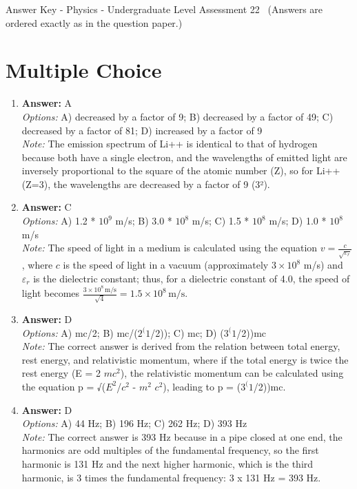 \documentclass[12pt]{article}
\begin{document}
\begin{center}
Answer Key - Physics - Undergraduate Level Assessment 22 \
\small (Answers are ordered exactly as in the question paper.)
\end{center}

\section*{Multiple Choice}
\begin{enumerate}[label=\arabic*.]
\item \textbf{Answer:} A
\\ \textit{Options:} A) decreased by a factor of 9; B) decreased by a factor of 49; C) decreased by a factor of 81; D) increased by a factor of 9
\\ \textit{Note:} The emission spectrum of Li++ is identical to that of hydrogen because both have a single electron, and the wavelengths of emitted light are inversely proportional to the square of the atomic number (Z), so for Li++ (Z=3), the wavelengths are decreased by a factor of 9 (3²).
\item \textbf{Answer:} C
\\ \textit{Options:} A) 1.2 * $10^9$ m/s; B) 3.0 * $10^8$ m/s; C) 1.5 * $10^8$ m/s; D) 1.0 * $10^8$ m/s
\\ \textit{Note:} The speed of light in a medium is calculated using the equation \( v = \frac{c}{\sqrt{\varepsilon_r}} \), where \( c \) is the speed of light in a vacuum (approximately \( 3 \times 10^8 \) m/s) and \( \varepsilon_r \) is the dielectric constant; thus, for a dielectric constant of 4.0, the speed of light becomes \( \frac{3 \times 10^8 \, \text{m/s}}{\sqrt{4}} = 1.5 \times 10^8 \, \text{m/s} \).
\item \textbf{Answer:} D
\\ \textit{Options:} A) mc/2; B) mc/($2^(1$/2)); C) mc; D) ($3^(1$/2))mc
\\ \textit{Note:} The correct answer is derived from the relation between total energy, rest energy, and relativistic momentum, where if the total energy is twice the rest energy (E = 2 $mc^2$), the relativistic momentum can be calculated using the equation p = √($E^2$/$c^2$ - $m^2$ $c^2$), leading to p = ($3^(1$/2))mc.
\item \textbf{Answer:} D
\\ \textit{Options:} A) 44 Hz; B) 196 Hz; C) 262 Hz; D) 393 Hz
\\ \textit{Note:} The correct answer is 393 Hz because in a pipe closed at one end, the harmonics are odd multiples of the fundamental frequency, so the first harmonic is 131 Hz and the next higher harmonic, which is the third harmonic, is 3 times the fundamental frequency: 3 x 131 Hz = 393 Hz.

\end{enumerate}
\end{document}
